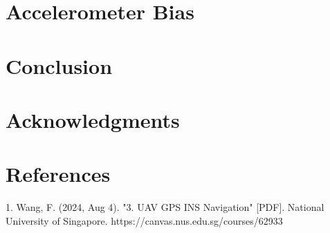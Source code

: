 \documentclass{rapport}
\begin{document}
\section{Accelerometer Bias}
\label{Accelerometer Bias}



\section{Conclusion}
\label{Conclusion}


\section*{Acknowledgments}
\label{Acknowledgements}


\section*{References}
1. Wang, F. (2024, Aug 4). "3. UAV GPS INS Navigation" [PDF]. National University of Singapore. https://canvas.nus.edu.sg/courses/62933

%
\end{document}
